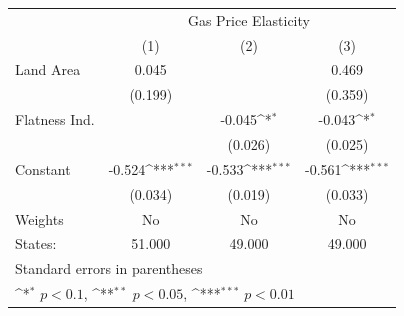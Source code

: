{
\def\sym#1{\ifmmode^{#1}\else\(^{#1}\)\fi}
\begin{tabular}{l*{3}{c}}
\hline\hline
            &\multicolumn{3}{c}{Gas Price Elasticity}                         \\
            &\multicolumn{1}{c}{(1)}         &\multicolumn{1}{c}{(2)}         &\multicolumn{1}{c}{(3)}         \\
\hline
Land Area   &       0.045         &                     &       0.469         \\
            &     (0.199)         &                     &     (0.359)         \\
[1em]
Flatness Ind.&                     &      -0.045\sym{*}  &      -0.043\sym{*}  \\
            &                     &     (0.026)         &     (0.025)         \\
[1em]
Constant    &      -0.524\sym{***}&      -0.533\sym{***}&      -0.561\sym{***}\\
            &     (0.034)         &     (0.019)         &     (0.033)         \\
\hline
Weights     &          No         &          No         &          No         \\
States:     &      51.000         &      49.000         &      49.000         \\
\hline\hline
\multicolumn{4}{l}{\footnotesize Standard errors in parentheses}\\
\multicolumn{4}{l}{\footnotesize \sym{*} \(p<0.1\), \sym{**} \(p<0.05\), \sym{***} \(p<0.01\)}\\
\end{tabular}
}
